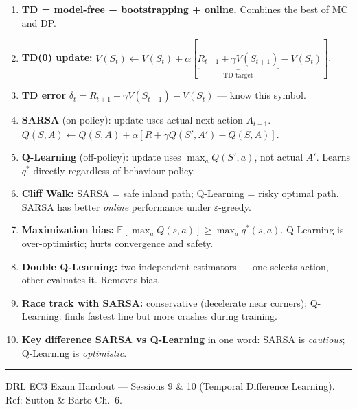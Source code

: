 \documentclass[11pt,a4paper]{article}
\begin{document}
\begin{tcolorbox}[exam={Must Know — TD Methods}]
\begin{enumerate}
  \item \textbf{TD = model-free + bootstrapping + online.} Combines the best of MC and DP.
  \item \textbf{TD(0) update:} $V(S_t) \leftarrow V(S_t) + \alpha[\underbrace{R_{t+1} + \gamma V(S_{t+1})}_{\text{TD target}} - V(S_t)]$.
  \item \textbf{TD error} $\delta_t = R_{t+1} + \gamma V(S_{t+1}) - V(S_t)$ — know this symbol.
  \item \textbf{SARSA} (on-policy): update uses actual next action $A_{t+1}$.
    $Q(S,A) \leftarrow Q(S,A) + \alpha[R + \gamma Q(S',A') - Q(S,A)]$.
  \item \textbf{Q-Learning} (off-policy): update uses $\max_a Q(S',a)$, not actual $A'$.
    Learns $q^*$ directly regardless of behaviour policy.
  \item \textbf{Cliff Walk:} SARSA = safe inland path; Q-Learning = risky optimal path.
    SARSA has better \emph{online} performance under $\varepsilon$-greedy.
  \item \textbf{Maximization bias:} $\mathbb{E}[\max_a Q(s,a)] \geq \max_a q^*(s,a)$.
    Q-Learning is over-optimistic; hurts convergence and safety.
  \item \textbf{Double Q-Learning:} two independent estimators — one selects action, other evaluates it. Removes bias.
  \item \textbf{Race track with SARSA:} conservative (decelerate near corners);
    Q-Learning: finds fastest line but more crashes during training.
  \item \textbf{Key difference SARSA vs Q-Learning} in one word: SARSA is \emph{cautious};
    Q-Learning is \emph{optimistic}.
\end{enumerate}
\end{tcolorbox}

\vspace{4pt}
\hrule
\vspace{3pt}
{\footnotesize DRL EC3 Exam Handout — Sessions 9 \& 10 (Temporal Difference Learning). Ref: Sutton \& Barto Ch.~6.}
\end{document}
